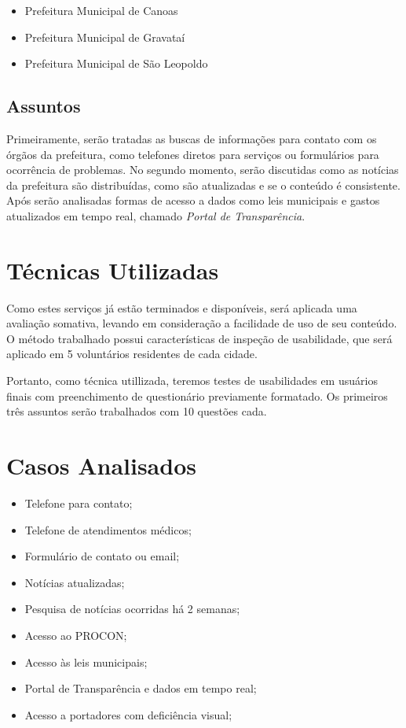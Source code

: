 \documentclass{article}
\begin{document}
\begin{itemize}
  \item Prefeitura Municipal de Canoas
  \item Prefeitura Municipal de Gravataí
  \item Prefeitura Municipal de São Leopoldo
\end{itemize}

\subsection{Assuntos}

Primeiramente, serão tratadas as buscas de informações para contato com os
órgãos da prefeitura, como telefones diretos para serviços ou formulários para
ocorrência de problemas. No segundo momento, serão discutidas como as notícias
da prefeitura são distribuídas, como são atualizadas e se o conteúdo é
consistente. Após serão analisadas formas de acesso a dados como leis municipais
e gastos atualizados em tempo real, chamado \textit{Portal de Transparência}.

\section{Técnicas Utilizadas}

Como estes serviços já estão terminados e disponíveis, será aplicada uma
avaliação somativa, levando em consideração a facilidade de uso de seu conteúdo.
O método trabalhado possui características de inspeção de usabilidade, que será
aplicado em 5 voluntários residentes de cada cidade.

Portanto, como técnica utillizada, teremos testes de usabilidades em usuários
finais com preenchimento de questionário previamente formatado. Os primeiros
três assuntos serão trabalhados com 10 questões cada.

\section{Casos Analisados}

\begin{itemize}
  \item Telefone para contato;
  \item Telefone de atendimentos médicos;
  \item Formulário de contato ou email;
  \item Notícias atualizadas;
  \item Pesquisa de notícias ocorridas há 2 semanas;
  \item Acesso ao PROCON;
  \item Acesso às leis municipais;
  \item Portal de Transparência e dados em tempo real;
  \item Acesso a portadores com deficiência visual;
\end{itemize}
\end{document}
